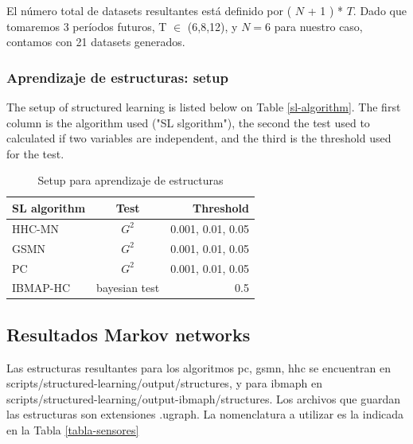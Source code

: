 \documentclass[final,a4paper]{llncs}
\begin{document}
El número total de datasets resultantes está definido por ( $N$ + 1 ) * $T$. 
Dado que tomaremos 3 períodos futuros, T $\in$ (6,8,12), y $N=6$ para nuestro caso,
contamos con 21 datasets generados.


\subsubsection{Aprendizaje de estructuras: setup} \label{sec:mn}

The setup of structured learning is listed below on Table \ref{sl-algorithm}. 
The first column is the algorithm used ("SL slgorithm"), the second the test
used to calculated if two variables are independent, and the third is the 
threshold used for the test.

\begin{table}[h]
\begin{center}
\caption{Setup para aprendizaje de estructuras}
\begin{tabular}{| l | c | r |}
\hline
  SL algorithm & Test & Threshold  \\ \hline \hline
  HHC-MN  \cite{schluter2014ibmap} & $G^2$ & 0.001, 0.01, 0.05 \\ \hline
  GSMN \cite{bromberg2009efficient} &$G^2$ & 0.001, 0.01, 0.05 \\ \hline  
  PC \cite{spirtes2000causation}&$G^2$ & 0.001, 0.01, 0.05  \\  \hline
  IBMAP-HC \cite{schluter2014ibmap} & bayesian test & 0.5  \\  \hline
\end{tabular} 
\end{center}
\end{table}\label{sl-algorithm}

\subsection{Resultados Markov networks}

Las estructuras resultantes para los algoritmos pc, gsmn, hhc 
se encuentran en scripts/structured-learning/output/structures,
y para ibmaph en scripts/structured-learning/output-ibmaph/structures.
Los archivos que guardan las estructuras son extensiones .ugraph.
La nomenclatura a utilizar es la indicada en la Tabla \ref{tabla-sensores}
\end{document}
